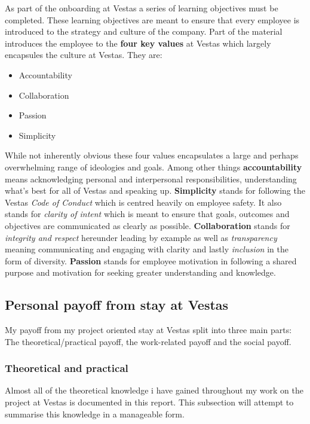 \medskip
\noindent As part of the onboarding at Vestas a series of learning objectives must be completed. These learning objectives are meant to ensure that every employee is introduced to the strategy and culture of the company. Part of the material introduces the employee to the \textbf{four key values} at Vestas which largely encapsules the culture at Vestas. They are: 
\begin{itemize}
	\item Accountability
	\item Collaboration
	\item Passion
	\item Simplicity
\end{itemize}
While not inherently obvious these four values encapsulates a large and perhaps overwhelming range of ideologies and goals. Among other things \textbf{accountability} means acknowledging personal and interpersonal responsibilities, understanding what's best for all of Vestas and speaking up. \textbf{Simplicity} stands for following the Vestas \textit{Code of Conduct} which is centred heavily on employee safety. It also stands for \textit{clarity of intent} which is meant to ensure that goals, outcomes and objectives are communicated as clearly as possible. \textbf{Collaboration} stands for \textit{integrity and respect} hereunder leading by example as well as \textit{transparency} meaning communicating and engaging with clarity and lastly \textit{inclusion} in the form of diversity. \textbf{Passion} stands for employee motivation in following a shared purpose and motivation for seeking greater understanding and knowledge.



\subsection{Personal payoff from stay at Vestas}
My payoff from my project oriented stay at Vestas split into three main parts: The theoretical/practical payoff, the work-related payoff and the social payoff.


\subsubsection{Theoretical and practical}
Almost all of the theoretical knowledge i have gained throughout my work on the project at Vestas is documented in this report. This subsection will attempt to summarise this knowledge in a manageable form.

